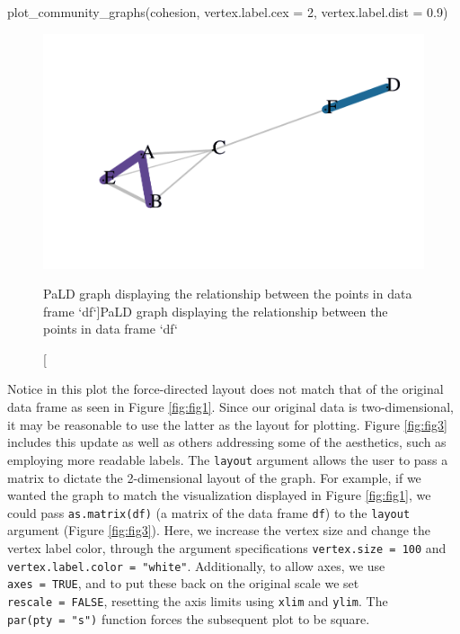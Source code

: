 \begin{Schunk}
\begin{Sinput}
plot_community_graphs(cohesion,
                      vertex.label.cex = 2,
                      vertex.label.dist = 0.9)
\end{Sinput}
\begin{figure}[H]
\includegraphics[width=5in,trim=0in 1in 0in 0.7in,clip]{dagostino-mcgowan_files/figure-latex/fig2-1} \caption[PaLD graph displaying the relationship between the points in data frame `df`]{PaLD graph displaying the relationship between the points in data frame `df`}\label{fig:fig2}
\end{figure}
\end{Schunk}

Notice in this plot the force-directed layout does not match that of the
original data frame as seen in Figure \ref{fig:fig1}. Since our original
data is two-dimensional, it may be reasonable to use the latter as the
layout for plotting. Figure \ref{fig:fig3} includes this update as well
as others addressing some of the aesthetics, such as employing more
readable labels. The \texttt{layout} argument allows the user to pass a
matrix to dictate the 2-dimensional layout of the graph. For example, if
we wanted the graph to match the visualization displayed in Figure
\ref{fig:fig1}, we could pass \texttt{as.matrix(df)} (a matrix of the
data frame \texttt{df}) to the \texttt{layout} argument (Figure
\ref{fig:fig3}). Here, we increase the vertex size and change the vertex
label color, through the argument specifications
\texttt{vertex.size\ =\ 100} and
\texttt{vertex.label.color\ =\ "white"}. Additionally, to allow axes, we
use \texttt{axes\ =\ TRUE}, and to put these back on the original scale
we set \texttt{rescale\ =\ FALSE}, resetting the axis limits using
\texttt{xlim} and \texttt{ylim}. The \texttt{par(pty\ =\ "s")} function
forces the subsequent plot to be square.

